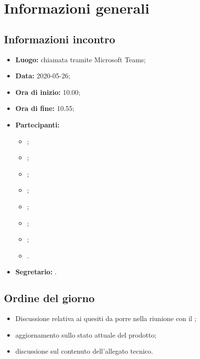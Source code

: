\section{Informazioni generali}
\subsection{Informazioni incontro}
\begin{itemize}
	\item \textbf{Luogo:} chiamata tramite Microsoft Teams;
	\item \textbf{Data:} 2020-05-26;
	\item \textbf{Ora di inizio:} 10.00;
	\item \textbf{Ora di fine:} 10.55;
	\item \textbf{Partecipanti:}
		\begin{itemize}
			\item \VB;
			\item \LB;
			\item \NF;
			\item \EG;
			\item \FJ;
			\item \MP;
			\item \AS;
			\item \AZ.
		\end{itemize}
	\item \textbf{Segretario:} \MP.
\end{itemize}

\subsection{Ordine del giorno}
\begin{itemize}
	\item Discussione relativa ai quesiti da porre nella riunione con il \TV ;
	\item aggiornamento sullo stato attuale del prodotto;
	\item discussione sul contenuto dell'allegato tecnico.
\end{itemize}
